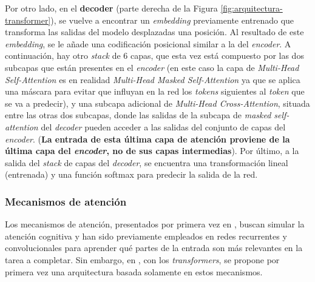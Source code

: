 \vspace{2mm}
Por otro lado, en el \textbf{decoder} (parte derecha de la Figura \ref{fig:arquitectura-transformer}), se vuelve a encontrar un \textit{embedding} previamente entrenado que transforma las salidas del modelo desplazadas una posición. Al resultado de este \textit{embedding}, se le añade una codificación posicional similar a la del \textit{encoder}. A continuación, hay otro \textit{stack} de 6 capas, que esta vez está compuesto por las dos subcapas que están presentes en el \textit{encoder} (en este caso la capa de \textit{Multi-Head Self-Attention} es en realidad \textit{Multi-Head Masked Self-Attention} ya que se aplica una máscara para evitar que influyan en la red los \textit{tokens} siguientes al \textit{token} que se va a predecir), y una subcapa adicional de \textit{Multi-Head Cross-Attention}, situada entre las otras dos subcapas, donde las salidas de la subcapa de \textit{masked self-attention} del \textit{decoder} pueden acceder a las salidas del conjunto de capas del \textit{encoder}. (\textbf{La entrada de esta última capa de atención proviene de la última capa del \textit{encoder}, no de sus capas intermedias}). Por último, a la salida del \textit{stack} de capas del \textit{decoder}, se encuentra una transformación lineal (entrenada) y una función softmax para predecir la salida de la red.

\subsubsection{Mecanismos de atención}

\vspace{2mm}
Los mecanismos de atención, presentados por primera vez en \cite{neuralmachinetranslationalignandtranslate}, buscan simular la atención cognitiva y han sido previamente empleados en redes recurrentes \cite{pmlr-v37-xuc15} y convolucionales \cite{7298685, 7410695} para aprender qué partes de la entrada son más relevantes en la tarea a completar. Sin embargo, en \cite{NIPS2017_3f5ee243}, con los \textit{transformers}, se propone por primera vez una arquitectura basada solamente en estos mecanismos. 

